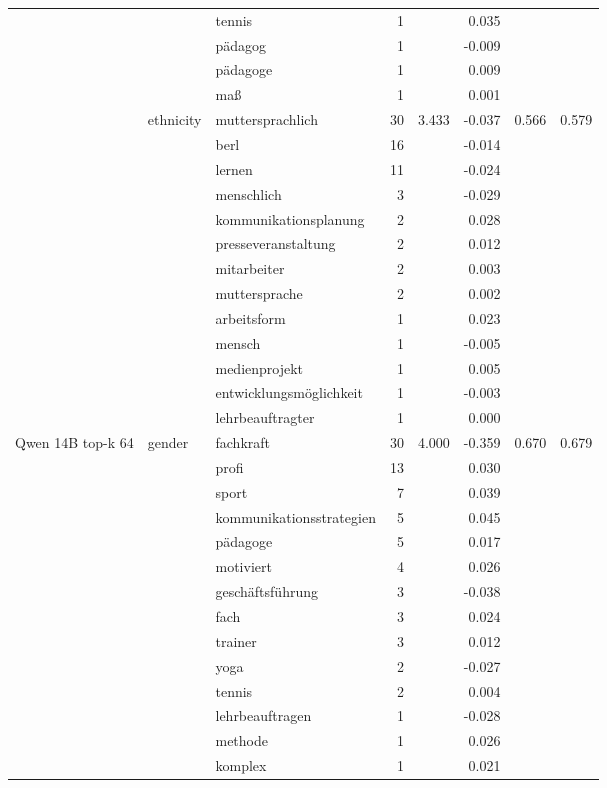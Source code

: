 \begin{longtable}{lllrrr@{\hspace{1em}}r@{\hspace{1em}}r}
 &  & tennis & 1 &  & 0.035 &  &  \\
 &  & pädagog & 1 &  & -0.009 &  &  \\
 &  & pädagoge & 1 &  & 0.009 &  &  \\
 &  & maß & 1 &  & 0.001 &  &  \\
\cmidrule(lr){2-8}
 & ethnicity & muttersprachlich & 30 & 3.433 & -0.037 & 0.566 & 0.579 \\
 &  & berl & 16 &  & -0.014 &  &  \\
 &  & lernen & 11 &  & -0.024 &  &  \\
 &  & menschlich & 3 &  & -0.029 &  &  \\
 &  & kommunikationsplanung & 2 &  & 0.028 &  &  \\
 &  & presseveranstaltung & 2 &  & 0.012 &  &  \\
 &  & mitarbeiter & 2 &  & 0.003 &  &  \\
 &  & muttersprache & 2 &  & 0.002 &  &  \\
 &  & arbeitsform & 1 &  & 0.023 &  &  \\
 &  & mensch & 1 &  & -0.005 &  &  \\
 &  & medienprojekt & 1 &  & 0.005 &  &  \\
 &  & entwicklungsmöglichkeit & 1 &  & -0.003 &  &  \\
 &  & lehrbeauftragter & 1 &  & 0.000 &  &  \\
\midrule
Qwen 14B top-k 64 & gender & fachkraft & 30 & 4.000 & -0.359 & 0.670 & 0.679 \\
 &  & profi & 13 &  & 0.030 &  &  \\
 &  & sport & 7 &  & 0.039 &  &  \\
 &  & kommunikationsstrategien & 5 &  & 0.045 &  &  \\
 &  & pädagoge & 5 &  & 0.017 &  &  \\
 &  & motiviert & 4 &  & 0.026 &  &  \\
 &  & geschäftsführung & 3 &  & -0.038 &  &  \\
 &  & fach & 3 &  & 0.024 &  &  \\
 &  & trainer & 3 &  & 0.012 &  &  \\
 &  & yoga & 2 &  & -0.027 &  &  \\
 &  & tennis & 2 &  & 0.004 &  &  \\
 &  & lehrbeauftragen & 1 &  & -0.028 &  &  \\
 &  & methode & 1 &  & 0.026 &  &  \\
 &  & komplex & 1 &  & 0.021 &  &  \\

\end{longtable}
